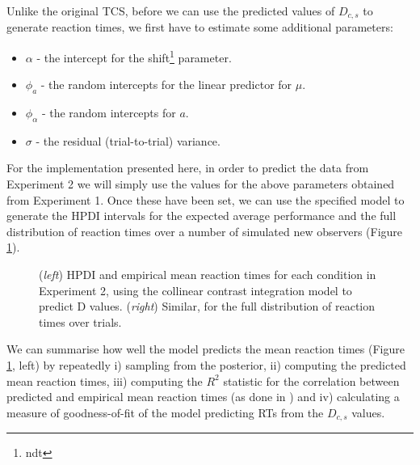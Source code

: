 \documentclass[smallextended, natbib]{svjour3}       %
\begin{document}
Unlike the original TCS, before we can use the predicted values of $D_{c,s}$ to generate reaction times, we first have to estimate some additional parameters: 

\begin{itemize}	
\item $\alpha$ - the intercept for the shift\footnote{ndt} parameter.
\item $\phi_a$ - the random intercepts for the linear predictor for $\mu$.
\item $\phi_\alpha$ - the random intercepts for $a$.
\item $\sigma$ - the residual (trial-to-trial) variance. 
\end{itemize}

For the implementation presented here, in order to predict the data from Experiment 2 we will simply use the values for the above parameters obtained from Experiment 1. Once these have been set, we can use the specified model to generate the HPDI intervals for the expected average performance and the full distribution of reaction times over a number of simulated new observers (Figure \ref{fig:buetti2019_rt}).

\begin{figure}
\centering
{}
\caption{(\textit{left}) HPDI and empirical mean reaction times for each condition in Experiment 2, using the collinear contrast integration model to predict D values. (\textit{right}) Similar, for the full distribution of reaction times over trials. }
\label{fig:buetti2019_rt}
\end{figure}

We can summarise how well the model predicts the mean reaction times (Figure \ref{fig:buetti2019_rt}, left) by repeatedly i) sampling from the posterior, ii) computing the predicted mean reaction times, iii) computing the $R^2$ statistic for the correlation between predicted and empirical mean reaction times (as done in \cite{buetti2019predicting}) and iv) calculating a measure of goodness-of-fit of the model predicting RTs from the $D_{c,s}$ values.
\end{document}
